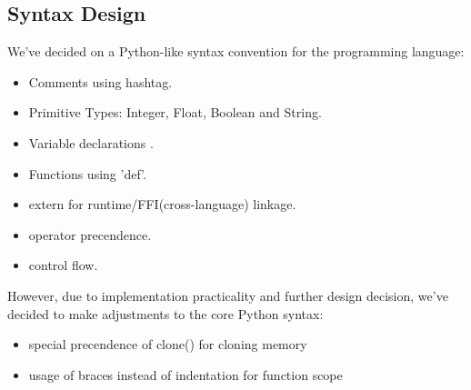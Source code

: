 \documentclass[a4paper]{article}
\begin{document}
\subsection{ Syntax Design }

We've decided on a Python-like syntax convention for the programming language:
\begin{itemize}
	\item Comments using hashtag.
	\item Primitive Types: Integer, Float, Boolean and String.
	\item Variable declarations .
	\item Functions using 'def'.
	\item extern for runtime/FFI(cross-language) linkage.
	\item operator precendence.
	\item control flow.
\end{itemize}
However, due to implementation practicality and further design decision, we've decided to make adjustments to the core Python syntax:
\begin{itemize}
	\item special precendence of clone() for cloning memory
	\item usage of braces instead of indentation for function scope
\end{itemize}
\end{document}
